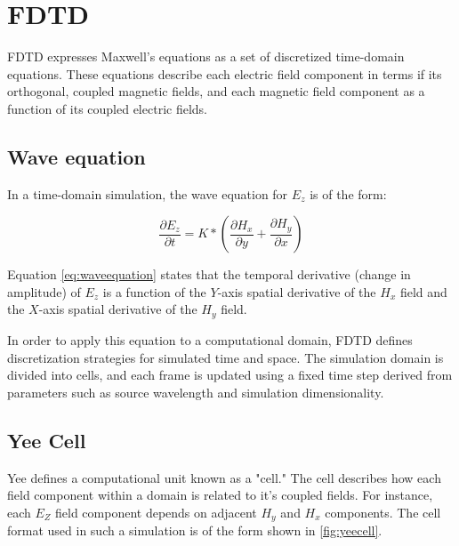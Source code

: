 
\chapter{FDTD} \label{ch:fdtd}


FDTD expresses Maxwell's equations as a set of discretized time-domain equations\cite{Yee}. These equations describe each electric field component in terms if its orthogonal, coupled magnetic fields, and each magnetic field component as a function of its coupled electric fields.


\section{Wave equation}

In a time-domain simulation, the wave equation for  $ E_z $ is of the form:

\begin{equation} \label{eq:waveequation} 
\frac{\partial E_z}{\partial t} = K * (\frac{\partial H_x}{\partial y} + \frac{\partial H_y}{\partial x})
\end{equation}

Equation \ref{eq:waveequation} states that the temporal derivative (change in amplitude) of $E_z$ is a function of the $Y$-axis spatial derivative of the $H_x$ field and the $X$-axis spatial derivative of the $H_y$ field.


In order to apply this equation to a computational domain, FDTD defines discretization strategies for simulated time and space. The simulation domain is divided into cells, and each frame is updated using a fixed time step derived from parameters such as source wavelength and simulation dimensionality.


\section{Yee Cell}

Yee \cite{Yee} defines a computational unit known as a "cell." The cell describes how each field component within a domain is related to it's coupled fields. For instance, each $E_Z$ field component depends on adjacent $H_y$ and $H_x$ components. The cell format used in such a simulation is of the form shown in \autoref{fig:yeecell}.

